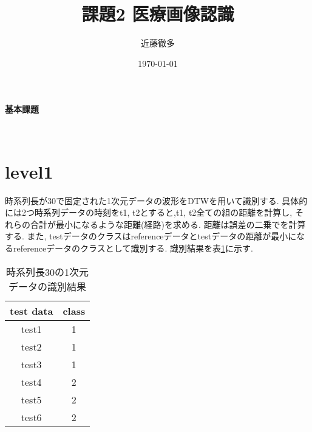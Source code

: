 
\graphicspath{{./pic/}}
\setlength{\textwidth}{16.2cm}%
\setlength{\textheight}{23cm}%
\setlength{\topmargin}{-1.5cm}
\setlength{\oddsidemargin}{0cm}
\setlength{\evensidemargin}{0cm}
\setlength{\parskip}{1pt}
\pagestyle{fancy}
\rhead[\today]{\today}
\title{課題2 医療画像認識}
\author{近藤徹多}
\date{\today}



	\maketitle
	\vspace*{20pt}

	\begin{center}
		{\LARGE \bf 基本課題}
	\end{center}
　　　　\addtocounter{section}{-1}
	\section{level1}
        時系列長が30で固定された1次元データの波形をDTWを用いて識別する.
        具体的には2つ時系列データの時刻をt1, t2とすると,t1, t2全ての組の距離を計算し,
        それらの合計が最小になるような距離(経路)を求める.
        距離は誤差の二乗でを計算する.
        また, testデータのクラスはreferenceデータとtestデータの距離が最小になるreferenceデータのクラスとして識別する.
        識別結果を表\ref{tb:result1}に示す.

        \begin{table}[]
            \centering
            \caption{時系列長30の1次元データの識別結果}
            \begin{tabular}{|c|c|}
                \hline
                test data & class \\ \hline
                test1     & 1     \\ \hline
                test2     & 1     \\ \hline
                test3     & 1     \\ \hline
                test4     & 2     \\ \hline
                test5     & 2     \\ \hline
                test6     & 2     \\ \hline
            \end{tabular}
            \label{tb:result1}
        \end{table}
            


